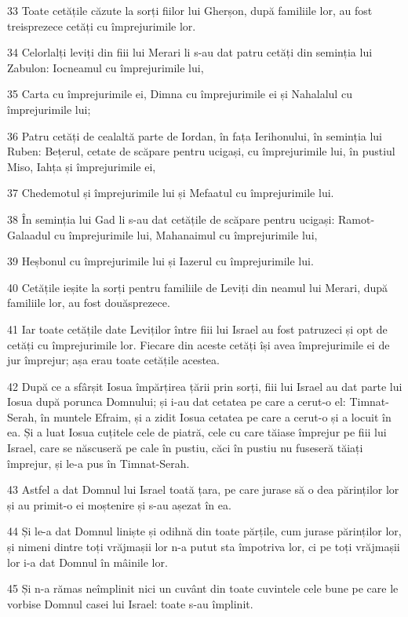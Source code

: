 \par 33 Toate cetățile căzute la sorți fiilor lui Gherșon, după familiile lor, au fost treisprezece cetăți cu împrejurimile lor.
\par 34 Celorlalți leviți din fiii lui Merari li s-au dat patru cetăți din seminția lui Zabulon: Iocneamul cu împrejurimile lui,
\par 35 Carta cu împrejurimile ei, Dimna cu împrejurimile ei și Nahalalul cu împrejurimile lui;
\par 36 Patru cetăți de cealaltă parte de Iordan, în fața Ierihonului, în seminția lui Ruben: Bețerul, cetate de scăpare pentru ucigași, cu împrejurimile lui, în pustiul Miso, Iahța și împrejurimile ei,
\par 37 Chedemotul și împrejurimile lui și Mefaatul cu împrejurimile lui.
\par 38 În seminția lui Gad li s-au dat cetățile de scăpare pentru ucigași: Ramot-Galaadul cu împrejurimile lui, Mahanaimul cu împrejurimile lui,
\par 39 Heșbonul cu împrejurimile lui și Iazerul cu împrejurimile lui.
\par 40 Cetățile ieșite la sorți pentru familiile de Leviți din neamul lui Merari, după familiile lor, au fost douăsprezece.
\par 41 Iar toate cetățile date Leviților între fiii lui Israel au fost patruzeci și opt de cetăți cu împrejurimile lor. Fiecare din aceste cetăți își avea împrejurimile ei de jur împrejur; așa erau toate cetățile acestea.
\par 42 După ce a sfârșit Iosua împărțirea țării prin sorți, fiii lui Israel au dat parte lui Iosua după porunca Domnului; și i-au dat cetatea pe care a cerut-o el: Timnat-Serah, în muntele Efraim, și a zidit Iosua cetatea pe care a cerut-o și a locuit în ea. Și a luat Iosua cuțitele cele de piatră, cele cu care tăiase împrejur pe fiii lui Israel, care se născuseră pe cale în pustiu, căci în pustiu nu fuseseră tăiați împrejur, și le-a pus în Timnat-Serah.
\par 43 Astfel a dat Domnul lui Israel toată țara, pe care jurase să o dea părinților lor și au primit-o ei moștenire și s-au așezat în ea.
\par 44 Și le-a dat Domnul liniște și odihnă din toate părțile, cum jurase părinților lor, și nimeni dintre toți vrăjmașii lor n-a putut sta împotriva lor, ci pe toți vrăjmașii lor i-a dat Domnul în mâinile lor.
\par 45 Și n-a rămas neîmplinit nici un cuvânt din toate cuvintele cele bune pe care le vorbise Domnul casei lui Israel: toate s-au împlinit.

